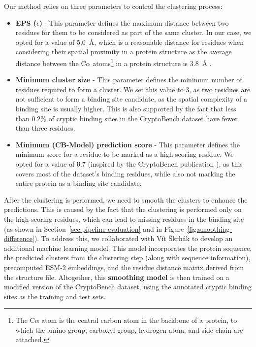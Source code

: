 Our method relies on three parameters to control the clustering process:
\begin{itemize}
    \item \textbf{EPS ($\epsilon$)} - This parameter defines the maximum distance between two residues for them to be considered as part of the same cluster. In our case, we opted for a value of 5.0~\AA, which is a reasonable distance for residues when considering their spatial proximity in a protein structure as the average distance between the C$\alpha$ atoms\footnote{The C$\alpha$ atom is the central carbon atom in the backbone of a protein, to which the amino group, carboxyl group, hydrogen atom, and side chain are attached.} in a protein structure is 3.8~\AA{} \cite{creighton1993proteins}.
    \item \textbf{Minimum cluster size} - This parameter defines the minimum number of residues required to form a cluster. We set this value to 3, as two residues are not sufficient to form a binding site candidate, as the spatial complexity of a binding site is usually higher. This is also supported by the fact that less than 0.2\% of cryptic binding sites in the CryptoBench dataset have fewer than three residues.
    \item \textbf{Minimum (CB-Model) prediction score} - This parameter defines the minimum score for a residue to be marked as a high-scoring residue. We opted for a value of 0.7 (inspired by the CryptoBench publication \cite{vskrhak2025cryptobench}), as this covers most of the dataset's binding residues, while also not marking the entire protein as a binding site candidate.
\end{itemize}

After the clustering is performed, we need to smooth the clusters to enhance the predictions. This is caused by the fact that the clustering is performed only on the high-scoring residues, which can lead to missing residues in the binding site (as shown in Section~\ref{sec:pipeline-evaluation} and in Figure~\ref{fig:smoothing-difference}). To address this, we collaborated with Vít Škrhák to develop an additional machine learning model. This model incorporates the protein sequence, the predicted clusters from the clustering step (along with sequence information), precomputed ESM-2 embeddings, and the residue distance matrix derived from the structure file. Altogether, this \textbf{smoothing model} is then trained on a modified version of the CryptoBench dataset, using the annotated cryptic binding sites as the training and test sets.

